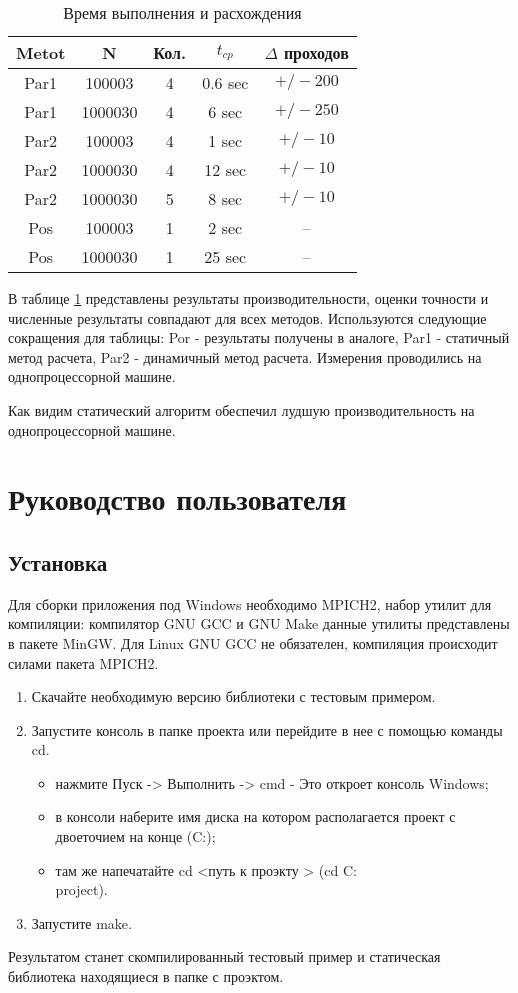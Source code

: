 \begin{table}[hp]
	\caption{Время выполнения и расхождения}
	\label{sample_table}
\begin{tabular}{|c|c|c|c|c|}
\hline 
Metot & N & Кол.& $t_{cp}$ & $\Delta$ проходов \\ \hline
Par1 & 100003 & 4 & 0.6 sec & $+/- 200 $ \\ \hline
Par1 & 1000030 & 4& 6 sec & $+/- 250 $ \\ \hline
Par2 & 100003 & 4 &1 sec & $+/- 10 $ \\ \hline
Par2 & 1000030 & 4 & 12 sec & $+/- 10 $ \\ \hline
Par2 & 1000030 & 5 & 8 sec & $+/- 10 $ \\ \hline
Pos & 100003 & 1 &2 sec & -- \\ \hline
Pos & 1000030 & 1 &25 sec & -- \\ \hline
\end{tabular}
\end{table}

В таблице \ref{sample_table} представлены результаты производительности, оценки точности и численные результаты совпадают для всех методов. Используются следующие сокращения для таблицы: Por - результаты получены в аналоге, Par1 - статичный метод расчета, Par2 - динамичный метод расчета. Измерения проводились на однопроцессорной машине.

Как видим статический алгоритм обеспечил лудшую производительность на однопроцессорной машине.
\chapter{Руководство пользователя}
\section{Установка}
Для сборки приложения под Windows необходимо MPICH2, набор утилит для компиляции: компилятор GNU GCC и GNU Make данные утилиты представлены в пакете MinGW. Для Linux GNU GCC не обязателен, компиляция происходит силами пакета MPICH2.
\begin{enumerate}
	\item Скачайте необходимую версию библиотеки с тестовым примером.
	\item Запустите консоль в папке проекта или перейдите в нее с помощью команды cd.
	\begin{itemize}
		\item нажмите Пуск -> Выполнить -> cmd - Это откроет консоль Windows;
		\item в консоли наберите имя диска на котором располагается проект с двоеточием на конце (C:);
		\item там же напечатайте cd <путь к проэкту > (cd C:\\project).
	\end{itemize}
	\item Запустите make.
\end{enumerate}
Результатом станет скомпилированный тестовый пример и статическая библиотека находящиеся в папке с проэктом.

